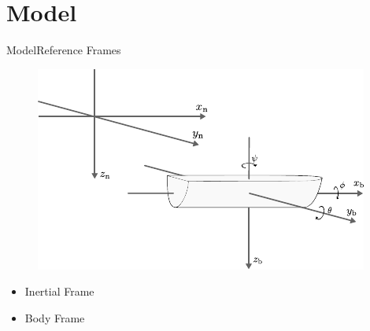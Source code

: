 \section{Model}

\begin{frame}{Model}{Reference Frames}
    \begin{figure}[H]
        \centering
        \includegraphics[width=1\linewidth]{figures/boat3D}
    \end{figure}
    \begin{itemize}
        \item Inertial Frame
        \item Body Frame
    \end{itemize}
\end{frame}


